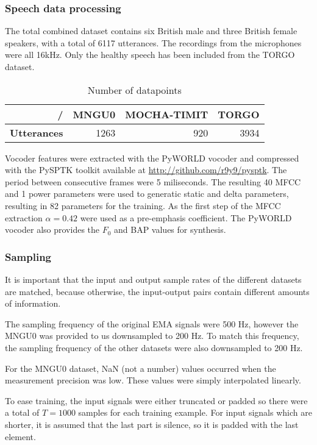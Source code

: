 \documentclass[a4paper]{article}
\begin{document}
\subsubsection{Speech data processing}

The total combined dataset contains six British male and three British female speakers, with a total
of 6117 utterances. The recordings from the microphones were all 16kHz. Only the healthy speech has been included from the TORGO dataset.

\begin{table}[th]
  \label{tab:electrodes}
  \caption{Number of datapoints}
  \centering
  \begin{tabular}{ r r r r }
    \toprule
    / & \textbf{MNGU0} & \textbf{MOCHA-TIMIT} & \textbf{TORGO} \\
    \midrule
    \textbf{Utterances} & 1263 & 920 & 3934
    \bottomrule
    \end{tabular}
\end{table}

Vocoder features were extracted with the PyWORLD vocoder \cite{Morise2016}
and compressed with the PySPTK toolkit available at \url{http://github.com/r9y9/pysptk}.
The period between consecutive frames were 5 miliseconds. The resulting 40 MFCC
and 1 power parameters were used to generatic static and delta parameters,
resulting in 82 parameters for the training. As the first step of the MFCC extraction \( \alpha
= 0.42 \) were used as a pre-emphasis coefficient. The PyWORLD vocoder
also provides the $ F_0 $ and BAP values for synthesis. 

\subsubsection{Sampling}

It is important that the input and output sample rates of the different
datasets are matched, because otherwise, the input-output pairs contain
different amounts of information.  

The sampling frequency of the original EMA signals were 500 Hz, however
the MNGU0 was provided to us downsampled to 200 Hz. To match this frequency,
the sampling frequency of the other datasets were also downsampled to 200 Hz.

For the MNGU0 dataset, NaN (not a number) values occurred when the measurement precision
was low. These values were simply interpolated linearly. 

To ease training, the input signals were either truncated or padded
so there were a total of \( T = 1000 \) samples for each training example.
For input signals which are shorter, it is assumed that the last part is
silence, so it is padded with the last element. 
\end{document}
